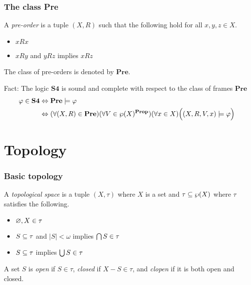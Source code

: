 \documentclass[
	11pt, %
	aspectratio=1610, %
]{beamer}
\begin{document}

\begin{frame}
	\frametitle{The class \textbf{Pre}}

	A \emph{pre-order} is a tuple $(X, R)$ such that the following hold for all $x, y, z \in X$.
	\begin{itemize}
		\item $xRx$
		\item $xRy$ and $yRz$ implies $xRz$
	\end{itemize}

	\bigskip

	The class of pre-orders is denoted by $\mathbf{Pre}$.

	\bigskip

	Fact: The logic $\mathbf{S4}$ is sound and complete with respect to the class of frames $\mathbf{Pre}$
	\begin{align*}
		\varphi \in \mathbf{S4} &\Leftrightarrow \mathbf{Pre} \models \varphi \\
		                        &\Leftrightarrow (\forall (X, R) \in \mathbf{Pre})(\forall V \in \wp(X)^{\mathbf{Prop}})(\forall x \in X)\Bigl((X, R, V, x) \models \varphi\Bigr)
	\end{align*}

\end{frame}


\section{Topology}


\begin{frame}
	\frametitle{Basic topology}

	A \emph{topological space} is a tuple $(X, \tau)$ where $X$ is a set and $\tau \subseteq \wp(X)$ where $\tau$ satisfies the following.
	\begin{itemize}
		\item $\varnothing, X \in \tau$
		\item $S \subseteq \tau$ and $|S| < \omega$ implies $\bigcap S \in \tau$
		\item $S \subseteq \tau$ implies $\bigcup S \in \tau$
	\end{itemize}

	\bigskip

	A set $S$ is \emph{open} if $S \in \tau$, \emph{closed} if $X - S \in \tau$, and \emph{clopen} if it is both open and closed.

\end{frame}
\end{document}
